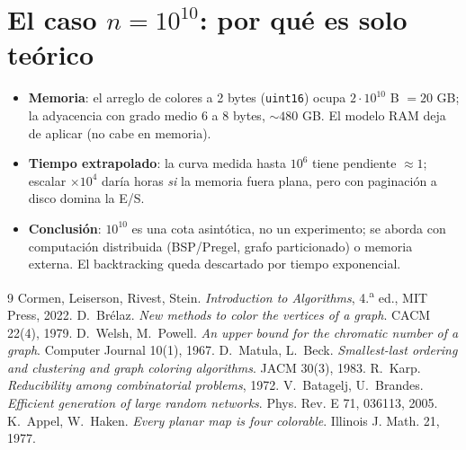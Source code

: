\documentclass[11pt,a4paper]{article}
\theoremstyle{definition}
\theoremstyle{remark}
\begin{document}
\section{El caso $n=10^{10}$: por qué es solo teórico}
\begin{itemize}[leftmargin=1.6em]
\item \textbf{Memoria}: el arreglo de colores a 2 bytes (\texttt{uint16}) ocupa
  $2\cdot10^{10}$ B $=20$ GB; la adyacencia con grado medio $6$ a 8 bytes,
  $\sim480$ GB. El modelo RAM deja de aplicar (no cabe en memoria).
\item \textbf{Tiempo extrapolado}: la curva medida hasta $10^6$ tiene pendiente
  $\approx1$; escalar $\times10^4$ daría horas \emph{si} la memoria fuera plana,
  pero con paginación a disco domina la E/S.
\item \textbf{Conclusión}: $10^{10}$ es una cota asintótica, no un experimento;
  se aborda con computación distribuida (BSP/Pregel, grafo particionado) o
  memoria externa. El backtracking queda descartado por tiempo exponencial.
\end{itemize}

\begin{thebibliography}{9}
 Cormen, Leiserson, Rivest, Stein. \emph{Introduction to
Algorithms}, 4.\textsuperscript{a} ed., MIT Press, 2022.
 D.~Brélaz. \emph{New methods to color the vertices of a graph}.
CACM 22(4), 1979.
 D.~Welsh, M.~Powell. \emph{An upper bound for the chromatic
number of a graph}. Computer Journal 10(1), 1967.
 D.~Matula, L.~Beck. \emph{Smallest-last ordering and clustering
and graph coloring algorithms}. JACM 30(3), 1983.
 R.~Karp. \emph{Reducibility among combinatorial problems}, 1972.
 V.~Batagelj, U.~Brandes. \emph{Efficient generation of large random
networks}. Phys. Rev. E 71, 036113, 2005.
 K.~Appel, W.~Haken. \emph{Every planar map is four colorable}.
Illinois J. Math. 21, 1977.
\end{thebibliography}
\end{document}
